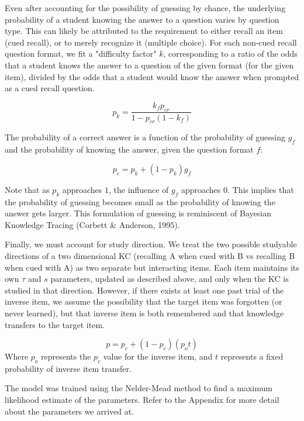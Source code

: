 \documentclass[a4paper,12pt]{article}
\begin{document}
Even after accounting for the possibility of guessing by chance, the underlying probability of a student knowing the answer to a question varies by question type. This can likely be attributed to the requirement to either recall an item (cued recall), or to merely recognize it (multiple choice). For each non-cued recall question format, we fit a "difficulty factor" $k$, corresponding to a ratio of the odds that a student knows the answer to a question of the given format (for the given item), divided by the odds that a student would know the answer when prompted as a cued recall question.

\begin{equation}
p_k= \frac{k_f p_{cr}}{1 - p_{cr}(1 - k_f) }
\end{equation}

The probability of a correct answer is a function of the probability of guessing $g_f$ and the probability of knowing the answer, given the question format $f$:

\begin{equation}
p_c=p_k + (1 - p_k) g_f
\end{equation}

Note that as $p_k$ approaches $1$, the influence of $g_f$ approaches $0$. This implies that the probability of guessing becomes small as the probability of knowing the answer gets larger. This formulation of guessing is reminiscent of Bayesian Knowledge Tracing (Corbett \& Anderson, 1995).

Finally, we must account for study direction. We treat the two possible studyable directions of a two dimensional KC (recalling A when cued with B vs recalling B when cued with A) as two separate but interacting items. Each item maintains its own $\tau$ and $s$ parameters, updated as described above, and only when the KC is studied in that direction. However, if there exists at least one past trial of the inverse item, we assume the possibility that the target item was forgotten (or never learned), but that inverse item is both remembered and that knowledge transfers to the target item.

\begin{equation}
p=p_c + (1 - p_c)(p_o t)
\end{equation}
Where $p_o$ represents the $p_c$ value for the inverse item, and $t$ represents a fixed probability of inverse item transfer.

The model was trained using the Nelder-Mead method to find a maximum likelihood estimate of the parameters. Refer to the Appendix for more detail about the parameters we arrived at.
\end{document}

